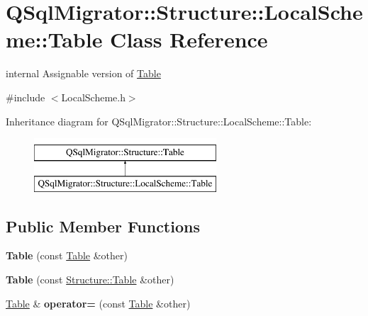 \hypertarget{class_q_sql_migrator_1_1_structure_1_1_local_scheme_1_1_table}{}\section{Q\+Sql\+Migrator\+:\+:Structure\+:\+:Local\+Scheme\+:\+:Table Class Reference}
\label{class_q_sql_migrator_1_1_structure_1_1_local_scheme_1_1_table}


internal Assignable version of \hyperlink{class_q_sql_migrator_1_1_structure_1_1_local_scheme_1_1_table}{Table}  




{\ttfamily \#include $<$Local\+Scheme.\+h$>$}

Inheritance diagram for Q\+Sql\+Migrator\+:\+:Structure\+:\+:Local\+Scheme\+:\+:Table\+:\begin{figure}[H]
\begin{center}
\leavevmode
\includegraphics[height=2.000000cm]{class_q_sql_migrator_1_1_structure_1_1_local_scheme_1_1_table}
\end{center}
\end{figure}
\subsection*{Public Member Functions}
\begin{DoxyCompactItemize}
\item 
\mbox{\label{class_q_sql_migrator_1_1_structure_1_1_local_scheme_1_1_table_a3a301a8913806e5fb1bfa4f1a4f67689}} 
{\bfseries Table} (const \hyperlink{class_q_sql_migrator_1_1_structure_1_1_local_scheme_1_1_table}{Table} \&other)
\item 
\mbox{\label{class_q_sql_migrator_1_1_structure_1_1_local_scheme_1_1_table_a63195c6a044d19298a180511ea0c3aa3}} 
{\bfseries Table} (const \hyperlink{class_q_sql_migrator_1_1_structure_1_1_table}{Structure\+::\+Table} \&other)
\item 
\mbox{\label{class_q_sql_migrator_1_1_structure_1_1_local_scheme_1_1_table_a8e7120b4bc853ee4d03d28978bbfede8}} 
\hyperlink{class_q_sql_migrator_1_1_structure_1_1_local_scheme_1_1_table}{Table} \& {\bfseries operator=} (const \hyperlink{class_q_sql_migrator_1_1_structure_1_1_local_scheme_1_1_table}{Table} \&other)
\end{DoxyCompactItemize}



